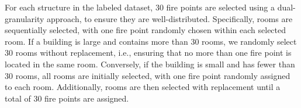 {For each structure in the labeled dataset, 30 fire points are selected using a dual-granularity approach,  to ensure they are well-distributed. Specifically, rooms are sequentially selected, with one fire point randomly chosen within each selected room. If a building is large and contains more than 30 rooms, we randomly select 30 rooms without replacement, i.e., ensuring that no more than one fire point is located in the same room. Conversely, if the building is small and has fewer than 30 rooms, all rooms are initially selected, with one fire point randomly assigned to each room. Additionally, rooms are then selected with replacement until a total of 30 fire points are assigned. 

}
